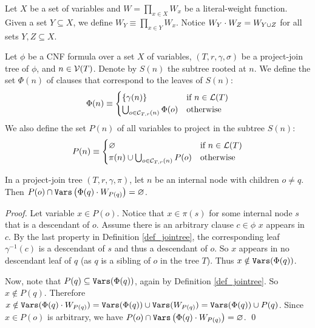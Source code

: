 Let $X$ be a set of variables and $W = \prod_{x \in X} W_x$ be a literal-weight function.
Given a set $Y \subseteq X$, we define $W_{Y} \equiv \prod_{x \in Y} W_x$.
Notice $W_Y \cdot W_Z = W_{Y \cup Z}$ for all sets $Y, Z \subseteq X$.

Let $\phi$ be a CNF formula over a set $X$ of variables, $(T, r, \gamma, \sigma)$ be a project-join tree of $\phi$, and $n \in \mathcal{V}(T)$.
Denote by $S(n)$ the subtree rooted at $n$.
We define the set $\Phi(n)$ of clauses that correspond to the leaves of $S(n)$:
\begin{align*}
    \Phi(n) \equiv
    \begin{cases}
        \left\{ \gamma(n) \right\} & \text{if } n \in \mathcal{L}(T) \\
        \bigcup_{o \in \mathcal{C}_{T,r}(n)} \Phi(o) & \text{otherwise}
    \end{cases}
\end{align*}
We also define the set $P(n)$ of all variables to project in the subtree $S(n)$:
\begin{align*}
    P(n) \equiv
    \begin{cases}
       \varnothing & \text{if } n \in \mathcal{L}(T) \\
        \pi(n) \cup \bigcup_{o \in \mathcal{C}_{T,r}(n)} P(o) & \text{otherwise}
    \end{cases}
\end{align*}

\begin{lemma}
\label{lemma_disjoint_P}
    In a project-join tree $(T, r, \gamma, \pi)$, let $n$ be an internal node with children $o \ne q$.
    Then $P(o) \cap \texttt{\upshape Vars} \left( \Phi(q) \cdot W_{P(q)} \right) = \varnothing$.
\end{lemma}
\begin{proof}
    Let variable $x \in P(o)$.
    Notice that $x \in \pi(s)$ for some internal node $s$ that is a descendant of $o$.
    Assume there is an arbitrary clause $c \in \phi$ \st{} $x$ appears in $c$.
    By the last property in Definition \ref{def_jointree}, the corresponding leaf $\gamma^{-1}(c)$ is a descendant of $s$ and thus a descendant of $o$.
    So $x$ appears in no descendant leaf of $q$ (as $q$ is a sibling of $o$ in the tree $T$).
    Thus $x \notin \texttt{\upshape Vars}(\Phi(q))$.

    Now, note that $P(q) \subseteq \texttt{\upshape Vars}(\Phi(q))$, again by Definition \ref{def_jointree}.
    So $x \notin P(q)$.
    Therefore $x \notin \texttt{\upshape Vars}(\Phi(q) \cdot W_{P(q)}) = \texttt{\upshape Vars}(\Phi(q)) \cup \texttt{\upshape Vars}(W_{P(q)}) = \texttt{\upshape Vars}(\Phi(q)) \cup P(q)$.
    Since $x \in P(o)$ is arbitrary, we have $P(o) \cap \texttt{\upshape Vars} \left( \Phi(q) \cdot W_{P(q)} \right) = \varnothing$.
\qed
\end{proof}

